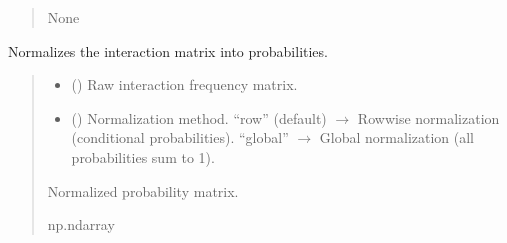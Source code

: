 \documentclass[letterpaper,10pt,english]{sphinxmanual}
\begin{document}
\begin{fulllineitems}
\begin{fulllineitems}
\begin{quote}
\begin{description}
\begin{itemize}
\end{itemize}

\sphinxAtStartPar
None

\end{description}\end{quote}

\end{fulllineitems}


\begin{fulllineitems}
\label{\detokenize{src:src.Analysis_Class.Analysis.normalize_interaction_matrix}}
\pysigstartsignatures
{}
\pysigstopsignatures
\sphinxAtStartPar
Normalizes the interaction matrix into probabilities.
\begin{quote}\begin{description}
\begin{itemize}
\item {} 
\sphinxAtStartPar
{} () \textendash{} Raw interaction frequency matrix.

\item {} 
\sphinxAtStartPar
{} () \textendash{} Normalization method.
“row” (default) \(\rightarrow\) Row\sphinxhyphen{}wise normalization (conditional probabilities).
“global” \(\rightarrow\) Global normalization (all probabilities sum to 1).

\end{itemize}

\sphinxAtStartPar
Normalized probability matrix.

\sphinxAtStartPar
np.ndarray

\end{description}\end{quote}

\end{fulllineitems}


\end{fulllineitems}
\end{document}
